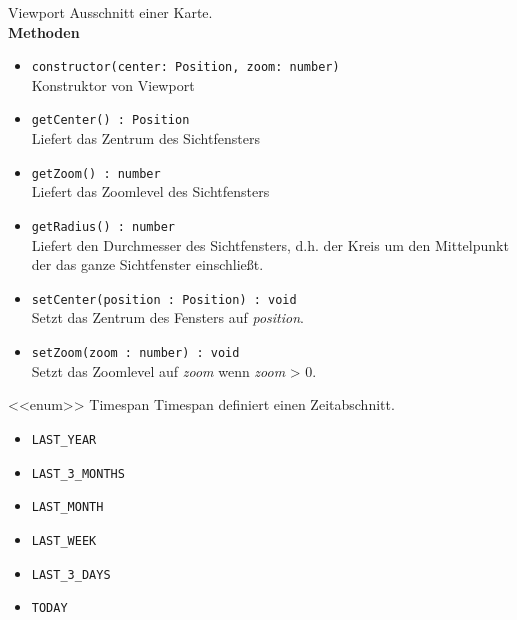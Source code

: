     \begin{Class}{Viewport}
        Ausschnitt einer Karte.
        \bigskip\\
        \textbf{Methoden}
        \begin{itemize}
            \item \texttt{constructor(center: Position, zoom: number)}
            \\ Konstruktor von Viewport
            \item \texttt{getCenter() : Position}
            \\ Liefert das Zentrum des Sichtfensters 
            \item \texttt{getZoom() : number}
            \\ Liefert das Zoomlevel des Sichtfensters
            \item \texttt{getRadius() : number}
            \\ Liefert den Durchmesser des Sichtfensters, 
            d.h. der Kreis um den Mittelpunkt der das ganze Sichtfenster einschließt.
            \item \texttt{setCenter(position : Position) : void}
            \\ Setzt das Zentrum des Fensters auf \emph{position}.
            \item \texttt{setZoom(zoom : number) : void}
            \\ Setzt das Zoomlevel auf \emph{zoom} wenn \emph{zoom} > 0.
        \end{itemize}
    \end{Class}

    \begin{Class}{<<enum>> Timespan}
        Timespan definiert einen Zeitabschnitt.
        \begin{itemize}
            \item \texttt{LAST\_YEAR}
            \item \texttt{LAST\_3\_MONTHS}
            \item \texttt{LAST\_MONTH}
            \item \texttt{LAST\_WEEK}
            \item \texttt{LAST\_3\_DAYS}
            \item \texttt{TODAY}
        \end{itemize}
    \end{Class}